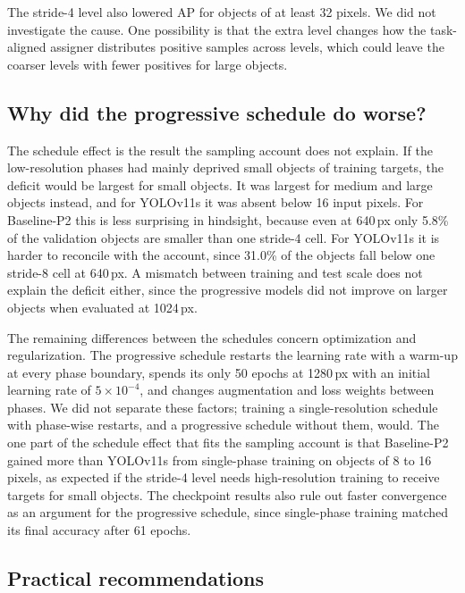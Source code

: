 \documentclass[preprint,12pt]{elsarticle}
\begin{document}
The stride-4 level also lowered AP for objects of at least 32 pixels. We did not
investigate the cause. One possibility is that the extra level changes how the
task-aligned assigner distributes positive samples across levels, which could
leave the coarser levels with fewer positives for large objects.

\subsection{Why did the progressive schedule do worse?}
\label{sec:why-schedule}

The schedule effect is the result the sampling account does not explain. If the
low-resolution phases had mainly deprived small objects of training targets, the
deficit would be largest for small objects. It was largest for medium and large
objects instead, and for YOLOv11s it was absent below 16 input pixels. For
Baseline-P2 this is less surprising in hindsight, because even at 640\,px only
5.8\% of the validation objects are smaller than one stride-4 cell. For YOLOv11s it
is harder to reconcile with the account, since 31.0\% of the objects fall below one
stride-8 cell at 640\,px. A mismatch between training and test scale does not
explain the deficit either, since the progressive models did not improve on larger
objects when evaluated at 1024\,px.

The remaining differences between the schedules concern optimization and
regularization. The progressive schedule restarts the learning rate with a warm-up
at every phase boundary, spends its only 50 epochs at 1280\,px with an initial
learning rate of $5\times10^{-4}$, and changes augmentation and loss weights
between phases. We did not separate these factors; training a single-resolution schedule
with phase-wise restarts, and a progressive schedule without them, would. The one
part of the schedule effect that fits the sampling account is that Baseline-P2
gained more than YOLOv11s from single-phase training on objects of 8 to 16 pixels,
as expected if the stride-4 level needs high-resolution training to receive
targets for small objects. The checkpoint results also rule out faster convergence
as an argument for the progressive schedule, since single-phase training matched
its final accuracy after 61 epochs.

\subsection{Practical recommendations}
\end{document}
